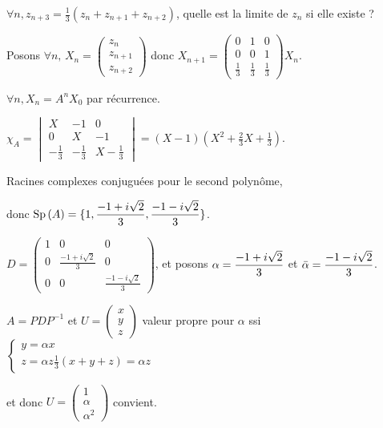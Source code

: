 \begin{exemple}
    $\forall n, z_{n + 3} = \frac 1 3 (z_n + z_{n + 1} + z_{n + 2})$, quelle est la limite 
    de $z_n$ si elle existe ?

    Posons $\forall n, \, X_n = \begin{pmatrix}
        z_n \\
        z_{n + 1} \\
        z_{n + 2}
    \end{pmatrix}$ donc $X_{n + 1} = \begin{pmatrix}
        0 & 1 & 0 \\
        0 & 0 & 1 \\
        \frac{1}{3} & \frac{1}{3} & \frac{1}{3}
    \end{pmatrix} X_n$.


    $\forall n, X_n = A^n X_0$ par récurrence. 

    $\chi_A = \begin{vmatrix}
        X & -1 & 0 \\
        0 & X & -1 \\
        -\frac{1}{3} & -\frac{1}{3} & X - \frac{1}{3}
    \end{vmatrix} = (X - 1)(X^2 + \frac{2}{3} X + \frac{1}{3})$.

    Racines complexes conjuguées pour le second polynôme, 
    
    donc $\displaystyle \operatorname{Sp} \,(A) = \{1, \frac{-1 + i \sqrt{2}}{3}, \frac{-1 - i \sqrt{2}}{3}\}$.

    $D = \begin{pmatrix}
        1 & 0 & 0 \\
        0 & \frac{-1 + i \sqrt{2}}{3} & 0 \\
        0 & 0 & \frac{-1 - i \sqrt{2}}{3}
    \end{pmatrix}$, et posons $\displaystyle \alpha = \frac{-1 + i \sqrt{2}}{3}$ et $\displaystyle \bar \alpha = \frac{-1 - i \sqrt{2}}{3}$.

    $A = PDP^{-1}$ et $U = \begin{pmatrix}
        x \\
        y \\
        z
    \end{pmatrix}$ valeur propre pour $\alpha$ ssi 
    $\begin{cases}
        y = \alpha x \\
        z = \alpha z 
        \frac 1 3 (x + y + z) = \alpha z
    \end{cases}$ 

    et donc $U = \begin{pmatrix}
        1 \\
        \alpha \\
        \alpha^2
    \end{pmatrix}$ convient. 


\end{exemple}
